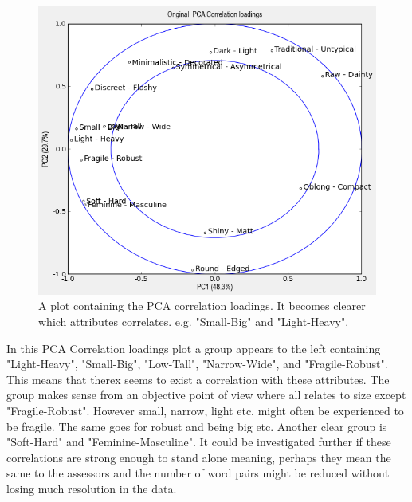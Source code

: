 \begin{figure}[H]
\centering
\includegraphics[width = \textwidth]{Figure/PCA_correlations.png}
\caption{A plot containing the PCA correlation loadings. It becomes clearer which attributes correlates. e.g. "Small-Big" and "Light-Heavy".}
\label{fig:pca}
\end{figure}

In this PCA Correlation loadings plot a group appears to the left containing "Light-Heavy", "Small-Big",  "Low-Tall", "Narrow-Wide", and "Fragile-Robust". This means that therex seems to exist a correlation with these attributes. The group makes sense from an objective point of view where all relates to size except "Fragile-Robust". However small, narrow, light etc. might often be experienced to be fragile. The same goes for robust and being big etc. Another clear group is "Soft-Hard" and "Feminine-Masculine". It could be investigated further if these correlations are strong enough to stand alone meaning, perhaps they mean the same to the assessors and the number of word pairs might be reduced without losing much resolution in the data.